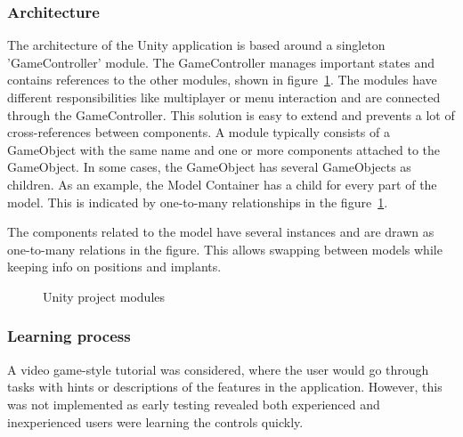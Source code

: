 \documentclass[a4paper]{report}
\begin{document}
\subsubsection{Architecture}
The architecture of the Unity application is based around a singleton 'GameController' module. The GameController manages important states and contains references to the other modules, shown in figure~\ref{structure}. The modules have different responsibilities like multiplayer or menu interaction and are connected through the GameController. This solution is easy to extend and prevents a lot of cross-references between components.
A module typically consists of a GameObject with the same name and one or more components attached to the GameObject. In some cases, the GameObject has several GameObjects as children.
As an example, the Model Container has a child for every part of the model. This is indicated by one-to-many relationships in the figure~\ref{structure}.

The components related to the model have several instances and are drawn as one-to-many relations in the figure. This allows swapping between models while keeping info on positions and implants.

\begin{figure}[h!]
    \centering

	\hfill
  \caption{Unity project modules}\label{structure}
  \small

\end{figure}

\subsubsection{Learning process}
A video game-style tutorial was considered, where the user would go through tasks with hints or descriptions of the features in the application. However, this was not implemented as early testing revealed both experienced and inexperienced users were learning the controls quickly.
\end{document}
